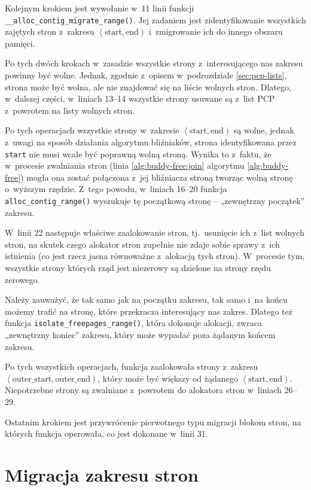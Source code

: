 Kolejnym krokiem jest wywołanie w~11 linii funkcji
\lstinline|__alloc_contig_migrate_range()|.  Jej zadaniem jest
zidentyfikowanie wszystkich zajętych stron z~zakresu
$\left<\mathrm{start}, \mathrm{end}\right)$ i~zmigrowanie ich do
innego obszaru pamięci.

Po tych dwóch krokach w~zasadzie wszystkie strony z~interesującego nas
zakresu powinny być wolne.  Jednak, zgodnie z~opisem w~podrozdziale
\ref{sec:pcp-lists}, strona może być wolna, ale nie znajdować się na
liście wolnych stron.  Dlatego, w~dalszej części, w~liniach 13--14
wszystkie strony usuwane są z~list PCP z~powrotem na listy wolnych
stron.

Po tych operacjach wszystkie strony w~zakresie $\left<\mathrm{start},
\mathrm{end}\right)$ są wolne, jednak z~uwagi na sposób działania
algorytmu bliźniaków, strona identyfikowana przez \lstinline|start|
nie musi wcale być poprawną wolną stroną.  Wynika to z~faktu, że
w~procesie zwalniania stron (linia \ref{alg:buddy-free:join} algorytmu
\ref{alg:buddy-free}) mogła ona zostać połączona z~jej bliźniacza
stroną tworząc wolną stronę o~wyższym rzędzie.  Z~tego powodu,
w~liniach 16--20 funkcja \lstinline|alloc_contig_range()| wyszukuje tę
początkową stronę -- „zewnętrzny początek” zakresu.

W~linii 22 następuje właściwe zaalokowanie stron, tj.\ usunięcie ich
z~list wolnych stron, na skutek czego alokator stron zupełnie nie
zdaje sobie sprawy z~ich istnienia (co jest rzecz jasna równoważne
z~alokacją tych stron).  W~procesie tym, wszystkie strony których rząd
jest niezerowy są dzielone na strony rzędu zerowego.

Należy zauważyć, że tak samo jak na początku zakresu, tak samo i~na
końcu możemy trafić na stronę, które przekracza interesujący nas
zakres.  Dlatego też funkcja \lstinline|isolate_freepages_range()|,
która dokonuje alokacji, zwraca „zewnętrzny koniec” zakresu, który
może wypadać poza żądanym końcem zakresu.

Po tych wszystkich operacjach, funkcja zaalokowała strony z~zakresu
$\left<\mathrm{outer\_start}, \mathrm{outer\_end}\right)$, który może
być większy od żądanego $\left<\mathrm{start}, \mathrm{end}\right)$.
Niepotrzebne strony są zwalniane z~powrotem do alokatora stron
w~liniach 26--29.

Ostatnim krokiem jest przywrócenie pierwotnego typu migracji blokom
stron, na których funkcja operowała, co jest dokonane w~linii 31.


\section{Migracja zakresu stron}\label{sec:alloc-contig-migrate-range}

